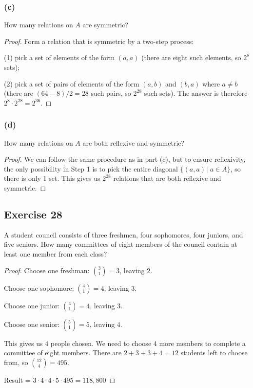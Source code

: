 \documentclass[14pt]{extarticle}
\begin{document}
\subsubsection{(c)}
How many relations on \(A\) are symmetric?

\begin{proof}
Form a relation that is symmetric by a two-step process: 

(1) pick a set of elements of the form \((a, a)\) (there are eight such elements, so \(2^8\) sets); 

(2) pick a set of pairs of elements of the form \((a, b)\) and \((b, a)\) where \(a \neq b\) (there are \((64 - 8)/2 = 28\) 
such pairs, so \(2^{28}\) such sets). The answer is therefore \(2^8 \cdot 2^{28} = 2^{36}\).
\end{proof}

\subsubsection{(d)}
How many relations on \(A\) are both reflexive and symmetric?

\begin{proof}
We can follow the same procedure as in part (c), but to ensure reflexivity, the only possibility in Step 1 is to pick the
entire diagonal \(\{(a,a) \,|\, a \in A\}\), so there is only 1 set. This gives us \(2^{28}\) relations that are both
reflexive and symmetric.
\end{proof}

\subsection{Exercise 28}
A student council consists of three freshmen, four sophomores, four juniors, and five seniors. How many committees of eight 
members of the council contain at least one member from each class?

\begin{proof}
Choose one freshman: \(\binom{3}{1} = 3\), leaving 2.

Choose one sophomore: \(\binom{4}{1} = 4\), leaving 3.

Choose one junior: \(\binom{4}{1} = 4\), leaving 3.

Choose one senior: \(\binom{5}{1} = 5\), leaving 4.

This gives us 4 people chosen. We need to choose 4 more members to complete a committee of eight members. There are
\(2+3+3+4 = 12\) students left to choose from, so \(\binom{12}{4} = 495\).

Result = \(3 \cdot 4 \cdot 4 \cdot 5 \cdot 495 = 118,800\)
\end{proof}
\end{document}
